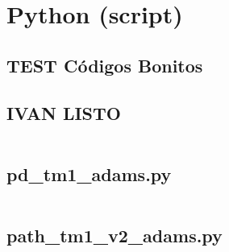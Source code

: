     
    
    \newpage
    
    \section{Python (script)}
    
        \subsection{TEST Códigos Bonitos} 
            
            \newpage    
            
            
    \subsection{IVAN LISTO}
   \begin{code}
        {\footnotesize 
                    \inputminted[frame=lines,
                                breaklines=true, 
                                framesep=2mm,
                                baselinestretch=1.2,
                                bgcolor=LightGray,
                                fontsize=\footnotesize,
                                linenos]{python}{Back/codigos_py/pd_tm1_adams.py}
                    }
    \end{code}
    
    \newpage    

   
   
   
   
   
   

        \subsection{pd\_tm1\_adams.py}
        {\footnotesize 
            \inputminted{python}{Back/codigos_py/pd_tm1_adams.py}
            }
        \newpage    
        
        \subsection{path\_tm1\_v2\_adams.py}
        {\footnotesize 
            \inputminted{python}{Back/codigos_py/path_tm1_v2_adams.py}
            }
        \newpage
        
